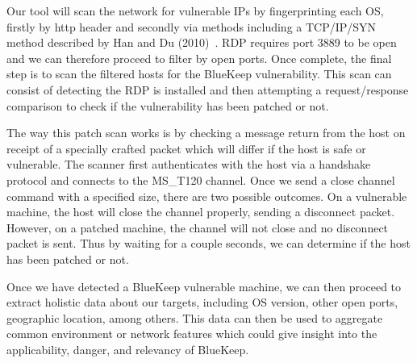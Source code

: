 Our tool will scan the network for vulnerable IPs by fingerprinting each OS, firstly by http header and secondly via methods including a TCP/IP/SYN method described by Han and Du (2010)~\cite{han_du_2010}. RDP requires port 3889 to be open and we can therefore proceed to filter by open ports. Once complete, the final step is to scan the filtered hosts for the BlueKeep vulnerability. This scan can consist of detecting the RDP is installed and then attempting a request/response comparison to check if the vulnerability has been patched or not. 

The way this patch scan works is by checking a message return from the host on receipt of a specially crafted packet which will differ if the host is safe or vulnerable. The scanner first authenticates with the host via a handshake protocol and connects to the MS\_T120 channel. Once we send a close channel command with a specified size, there are two possible outcomes. On a vulnerable machine, the host will close the channel properly, sending a disconnect packet. However, on a patched machine, the channel will not close and no disconnect packet is sent. Thus by waiting for a couple seconds, we can determine if the host has been patched or not.

Once we have detected a BlueKeep vulnerable machine, we can then proceed to extract holistic data about our targets, including OS version, other open ports, geographic location, among others. This data can then be used to aggregate common environment or network features which could give insight into the applicability, danger, and relevancy of BlueKeep.